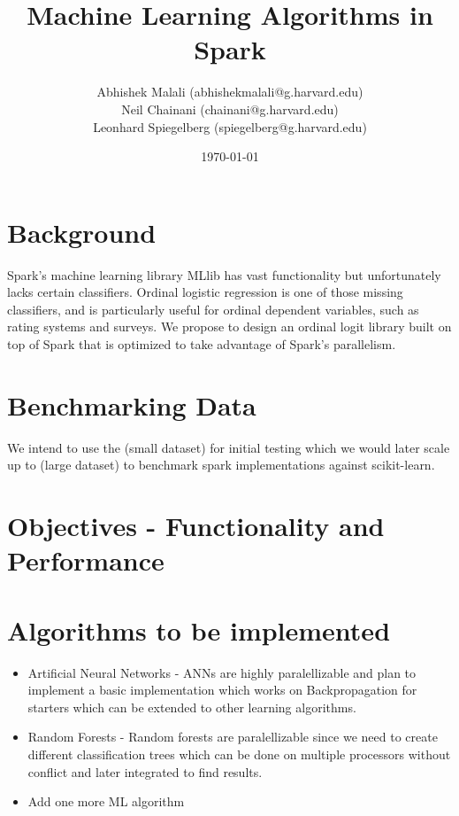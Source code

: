 \documentclass{article}
\begin{document}
	\title{Machine Learning Algorithms in Spark}
	\author{Abhishek Malali (abhishekmalali@g.harvard.edu)\\
			Neil Chainani (chainani@g.harvard.edu)\\
			Leonhard Spiegelberg (spiegelberg@g.harvard.edu)}
	\date{\today}
	\maketitle
	\section{Background}
	
	Spark's machine learning library MLlib has vast functionality but unfortunately lacks certain classifiers. Ordinal logistic regression is one of those missing classifiers, and is particularly useful for ordinal dependent variables, such as rating systems and surveys. We propose to design an ordinal logit library built on top of Spark that is optimized to take advantage of Spark's parallelism.  

	\section{Benchmarking Data}
	We intend to use the (small dataset) for initial testing which we would later scale up to (large dataset) to benchmark spark implementations against scikit-learn. 


	\section{Objectives - Functionality and Performance}

	\section{Algorithms to be implemented}
		\begin{itemize}
			\item Artificial Neural Networks - ANNs are highly paralellizable and plan to implement a basic implementation which works on Backpropagation for starters which can be extended to other learning algorithms.
			\item Random Forests - Random forests are paralellizable since we need to create different classification trees which can be done on multiple processors without conflict and later integrated to find results.
			\item Add one more ML algorithm
		\end{itemize}
\end{document}
